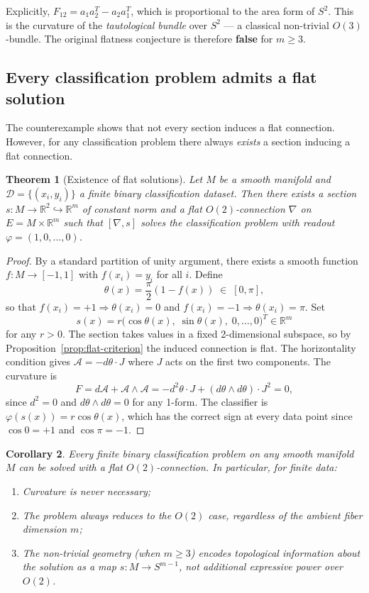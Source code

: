 \documentclass[11pt, a4paper]{article}
\theoremstyle{plain}
\newtheorem{theorem}{Theorem}[section]
\newtheorem{corollary}[theorem]{Corollary}
\theoremstyle{definition}
\newcommand{\R}{\mathbb{R}}
\newcommand{\Sig}{\mathcal{A}}
\begin{document}
Explicitly, $F_{12} = a_1 a_2^T - a_2 a_1^T$, which is proportional to the area
form of $S^2$. This is the curvature of the \emph{tautological bundle} over $S^2$
--- a classical non-trivial $O(3)$-bundle. The original flatness conjecture is
therefore \textbf{false} for $m \geq 3$.

\subsection{Every classification problem admits a flat solution}

The counterexample shows that not every section induces a flat connection. However,
for any classification problem there always \emph{exists} a section inducing a
flat connection.

\begin{theorem}[Existence of flat solutions]\label{thm:flat}
Let $M$ be a smooth manifold and $\mathcal{D} = \{(x_i, y_i)\}$ a finite binary
classification dataset. Then there exists a section $s: M \to \R^2
\hookrightarrow \R^m$ of constant norm and a flat $O(2)$-connection $\nabla$ on
$E = M \times \R^m$ such that $[\nabla, s]$ solves the classification problem
with readout $\varphi = (1,0,\ldots,0)$.
\end{theorem}

\begin{proof}
By a standard partition of unity argument, there exists a smooth function
$f: M \to [-1,1]$ with $f(x_i) = y_i$ for all $i$. Define
\[
  \theta(x) = \frac{\pi}{2}(1 - f(x)) \;\in\; [0,\pi],
\]
so that $f(x_i) = +1 \Rightarrow \theta(x_i) = 0$ and $f(x_i) = -1 \Rightarrow
\theta(x_i) = \pi$. Set
\[
  s(x) = r\bigl(\cos\theta(x),\;\sin\theta(x),\;0,\ldots,0\bigr)^T \in \R^m
\]
for any $r > 0$. The section takes values in a fixed 2-dimensional subspace, so
by Proposition~\ref{prop:flat-criterion} the induced connection is flat. The
horizontality condition gives $\Sig = -d\theta \cdot J$ where $J$ acts on the
first two components. The curvature is
\[
  F = d\Sig + \Sig\wedge\Sig = -d^2\theta\cdot J + (d\theta\wedge d\theta)\cdot J^2 = 0,
\]
since $d^2 = 0$ and $d\theta\wedge d\theta = 0$ for any 1-form. The classifier is
$\varphi(s(x)) = r\cos\theta(x)$, which has the correct sign at every data point
since $\cos 0 = +1$ and $\cos\pi = -1$.
\end{proof}

\begin{corollary}\label{cor:O2-sufficient}
Every finite binary classification problem on any smooth manifold $M$ can be
solved with a flat $O(2)$-connection. In particular, for finite data:
\begin{enumerate}[label=(\roman*), itemsep=2pt]
  \item Curvature is never necessary;
  \item The problem always reduces to the $O(2)$ case, regardless of the ambient
        fiber dimension $m$;
  \item The non-trivial geometry (when $m \geq 3$) encodes topological information
        about the solution as a map $s: M \to S^{m-1}$, not additional expressive
        power over $O(2)$.
\end{enumerate}
\end{corollary}
\end{document}
